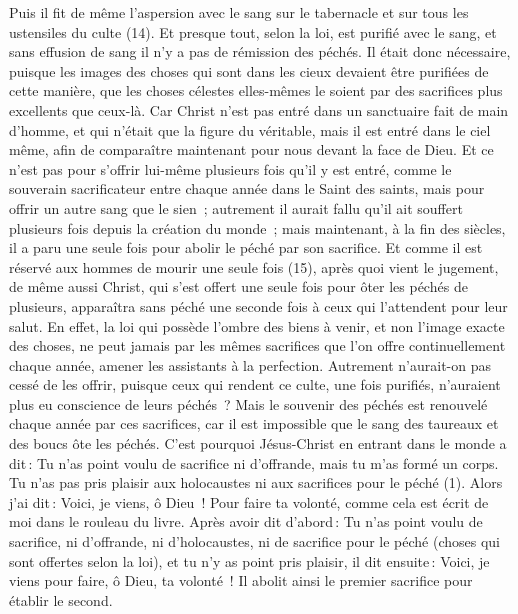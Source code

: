 \begin{multicols}{2}
Puis il fit de même l’aspersion avec le sang sur le tabernacle et sur tous les ustensiles du culte (14).
Et presque tout, selon la loi, est purifié avec le sang, et sans effusion de sang il n’y a pas de rémission des péchés.
Il était donc nécessaire, puisque les images des choses qui sont dans les cieux devaient être purifiées de cette manière, que les choses célestes elles-mêmes le soient par des sacrifices plus excellents que ceux-là.
Car Christ n'est pas entré dans un sanctuaire fait de main d’homme, et qui n’était que la figure du véritable, mais il est entré dans le ciel même, afin de comparaître maintenant pour nous devant la face de Dieu.
Et ce n’est pas pour s’offrir lui-même plusieurs fois qu’il y est entré, comme le souverain sacrificateur entre chaque année dans le Saint des saints, mais pour offrir un autre sang que le sien ;
autrement il aurait fallu qu'il ait souffert plusieurs fois depuis la création du monde ; mais maintenant, à la fin des siècles, il a paru une seule fois pour abolir le péché par son sacrifice.
Et comme il est réservé aux hommes de mourir une seule fois (15), après quoi vient le jugement,
de même aussi Christ, qui s’est offert une seule fois pour ôter les péchés de plusieurs, apparaîtra sans péché une seconde fois à ceux qui l'attendent pour leur salut.
\VerseOne{}En effet, la loi qui possède l'ombre des biens à venir, et non l’image exacte des choses, ne peut jamais par les mêmes sacrifices que l'on offre continuellement chaque année, amener les assistants à la perfection.
Autrement n’aurait-on pas cessé de les offrir, puisque ceux qui rendent ce culte, une fois purifiés, n’auraient plus eu conscience de leurs péchés ?
Mais le souvenir des péchés est renouvelé chaque année par ces sacrifices,
car il est impossible que le sang des taureaux et des boucs ôte les péchés.
C'est pourquoi Jésus-Christ en entrant dans le monde a dit : Tu n'as point voulu de sacrifice ni d'offrande, mais tu m'as formé un corps.
Tu n'as pas pris plaisir aux holocaustes ni aux sacrifices pour le péché (1).
Alors j'ai dit : Voici, je viens, ô Dieu ! Pour faire ta volonté, comme cela est écrit de moi dans le rouleau du livre.
Après avoir dit d’abord : Tu n'as point voulu de sacrifice, ni d'offrande, ni d'holocaustes, ni de sacrifice pour le péché (choses qui sont offertes selon la loi), et tu n'y as point pris plaisir, il dit ensuite : Voici, je viens pour faire, ô Dieu, ta volonté !
Il abolit ainsi le premier sacrifice pour établir le second.

\end{multicols}
